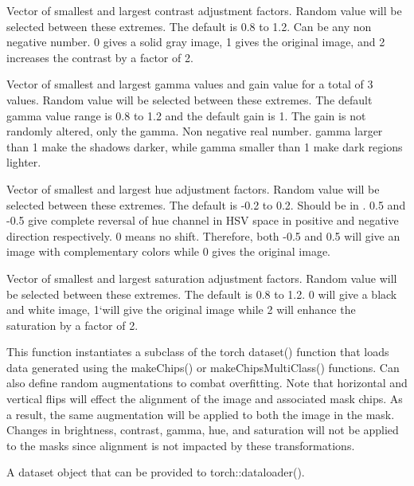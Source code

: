 \documentclass[a4paper]{book}
\begin{document}
\begin{Arguments}
\begin{ldescription}
\item[\code{contrastFactor}] Vector of smallest and largest contrast adjustment factors.
Random value will be selected between these extremes. The default is 0.8 to 1.2.
Can be any non negative number. 0 gives a solid gray image, 1 gives the original
image, and 2 increases the contrast by a factor of 2.

\item[\code{gammaFactor}] Vector of smallest and largest gamma values and gain value
for a total of 3 values. Random value will be selected between these extremes.
The default gamma value range is 0.8 to 1.2 and the default gain is 1. The gain
is not randomly altered, only the gamma. Non negative real number. gamma larger
than 1 make the shadows darker, while gamma smaller than 1 make dark regions
lighter.

\item[\code{hueFactor}] Vector of smallest and largest hue adjustment factors.
Random value will be selected between these extremes. The default is -0.2 to 0.2.
Should be in . 0.5 and -0.5 give complete reversal of hue channel
in HSV space in positive and negative direction respectively. 0 means no shift.
Therefore, both -0.5 and 0.5 will give an image with complementary colors while
0 gives the original image.

\item[\code{saturationFactor}] Vector of smallest and largest saturation adjustment factors.
Random value will be selected between these extremes. The default is 0.8 to 1.2.
0 will give a black and white image, 1`will give the original image while 2 will
enhance the saturation by a factor of 2.
\end{ldescription}
\end{Arguments}
%
\begin{Details}\relax
This function instantiates a subclass of the torch dataset() function that loads
data generated using the makeChips() or makeChipsMultiClass() functions. Can also
define random augmentations to combat overfitting. Note that horizontal and vertical
flips will effect the alignment of the image and associated mask chips. As a result,
the same augmentation will be applied to both the image in the mask. Changes in
brightness, contrast, gamma, hue, and saturation will not be applied to the masks
since alignment is not impacted by these transformations.
\end{Details}
%
\begin{Value}
A dataset object that can be provided to torch::dataloader().
\end{Value}
\end{document}
